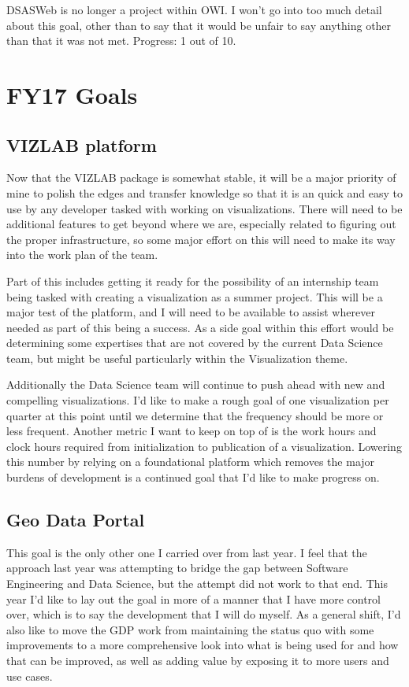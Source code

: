 \documentclass{article}
\begin{document}
DSASWeb is no longer a project within OWI.
I won't go into too much detail about this goal, other than to say that it would be unfair to say anything other than that it was not met.
Progress: 1 out of 10.

\section{FY17 Goals}

\subsection{VIZLAB platform}

Now that the VIZLAB package is somewhat stable, it will be a major priority of mine to polish the edges and transfer knowledge so that it is an quick and easy to use by any developer tasked with working on visualizations.
There will need to be additional features to get beyond where we are, especially related to figuring out the proper infrastructure, so some major effort on this will need to make its way into the work plan of the team.

Part of this includes getting it ready for the possibility of an internship team being tasked with creating a visualization as a summer project.
This will be a major test of the platform, and I will need to be available to assist wherever needed as part of this being a success.
As a side goal within this effort would be determining some expertises that are not covered by the current Data Science team, but might be useful particularly within the Visualization theme.

Additionally the Data Science team will continue to push ahead with new and compelling visualizations.
I'd like to make a rough goal of one visualization per quarter at this point until we determine that the frequency should be more or less frequent.
Another metric I want to keep on top of is the work hours and clock hours required from initialization to publication of a visualization.
Lowering this number by relying on a foundational platform which removes the major burdens of development is a continued goal that I'd like to make progress on.

\subsection{Geo Data Portal}

This goal is the only other one I carried over from last year.
I feel that the approach last year was attempting to bridge the gap between Software Engineering and Data Science, but the attempt did not work to that end.
This year I'd like to lay out the goal in more of a manner that I have more control over, which is to say the development that I will do myself.
As a general shift, I'd also like to move the GDP work from maintaining the status quo with some improvements to a more comprehensive look into what is being used for and how that can be improved, as well as adding value by exposing it to more users and use cases.
\end{document}
